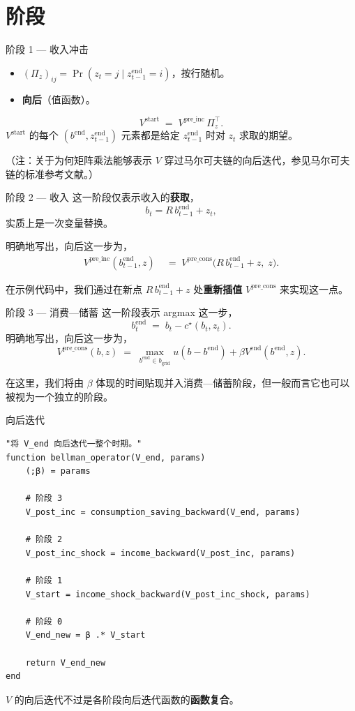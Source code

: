 \documentclass[10pt,aspectratio=169]{beamer}
\begin{document}
\section{阶段}

\begin{frame}{阶段 1 --- 收入冲击}
  \begin{itemize}
    \item $(\Pi_z)_{ij} = \Pr(z_t = j \mid z^{\mathrm{end}}_{t-1} = i)$，按行随机。
    \item \textbf{向后}（值函数）。
  \end{itemize}
  \[
    V^{\mathrm{start}} \;=\; V^{\mathrm{pre\_inc}} \, \Pi_z^\top.
  \]
  $V^{\mathrm{start}}$ 的每个 $(b^{\mathrm{end}}, z^{\mathrm{end}}_{t-1})$ 元素都是给定 $z^{\mathrm{end}}_{t-1}$ 时对 $z_t$ 求取的期望。

  （注：关于为何矩阵乘法能够表示 $V$ 穿过马尔可夫链的向后迭代，参见马尔可夫链的标准参考文献。）
\end{frame}

\begin{frame}{阶段 2 --- 收入}
  这一阶段仅表示收入的\textbf{获取}，
  \[
    b_t = R \, b^{\mathrm{end}}_{t-1} + z_t,
  \]
  实质上是一次变量替换。

  明确地写出，向后这一步为，
  \begin{align*}
    V^{\mathrm{pre\_inc}}(b^{\mathrm{end}}_{t-1}, z)
    \; &= \; V^{\mathrm{pre\_cons}}\!\big(R\, b^{\mathrm{end}}_{t-1} + z,\; z\big).
  \end{align*}

  在示例代码中，我们通过在新点 $R\, b^{\mathrm{end}}_{t-1} + z$ 处\textbf{重新插值} $V^{\mathrm{pre\_cons}}$ 来实现这一点。
\end{frame}

\begin{frame}{阶段 3 --- 消费—储蓄}
  这一阶段表示 argmax 这一步，
  \[
    b^{\mathrm{end}}_t \;=\; b_t - c^\star(b_t, z_t).
  \]
  明确地写出，向后这一步为，
  \[
    V^{\mathrm{pre\_cons}}(b, z) \;=\; \max_{b^{\mathrm{end}} \in b_{\mathrm{grid}}} u(b - b^{\mathrm{end}}) + \beta V^{\mathrm{end}}(b^{\mathrm{end}}, z).
  \]

  在这里，我们将由 $\beta$ 体现的时间贴现并入消费—储蓄阶段，但一般而言它也可以被视为一个独立的阶段。
\end{frame}

\begin{frame}[fragile]{向后迭代}
  \begin{lstlisting}
"将 V_end 向后迭代一整个时期。"
function bellman_operator(V_end, params)
    (;β) = params

    # 阶段 3
    V_post_inc = consumption_saving_backward(V_end, params)

    # 阶段 2
    V_post_inc_shock = income_backward(V_post_inc, params)

    # 阶段 1
    V_start = income_shock_backward(V_post_inc_shock, params)

    # 阶段 0
    V_end_new = β .* V_start

    return V_end_new
end
  \end{lstlisting}
  $V$ 的向后迭代不过是各阶段向后迭代函数的\textbf{函数复合}。
\end{frame}
\end{document}
